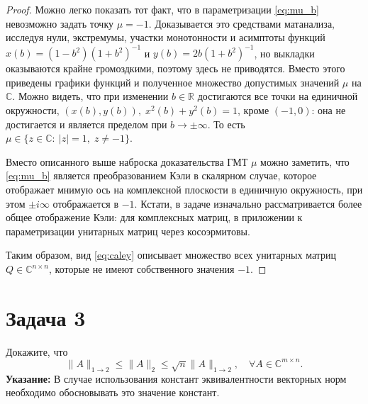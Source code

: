 \documentclass{article}
\newtheorem*{proof}{$\square$}
\newcommand{\R}{\mathbb{R}}
\renewcommand{\C}{\mathbb{C}}
\renewcommand{\leq}{\leqslant}
\begin{document}
\begin{proof}
		Можно легко показать тот факт, что в параметризации \eqref{eq:mu_b} невозможно задать точку $\mu=-1$. Доказывается это средствами матанализа, исследуя нули, экстремумы, участки монотонности и асимптоты функций $x(b)=(1-b^2)(1+b^2)^{-1}$ и $y(b)=2b (1+b^2)^{-1}$, но выкладки оказываются крайне громоздкими, поэтому здесь не приводятся. Вместо этого приведены графики функций и полученное множество допустимых значений $\mu$ на $\C$. Можно видеть, что при изменении $b\in\R$ достигаются все точки на единичной окружности, $(x(b), y(b)),\; x^2(b)+y^2(b)=1$, кроме $(-1, 0)$: она не достигается и является пределом при $b\rightarrow \pm \infty$. То есть $\mu \in \{z\in\C:\: |z|=1,\; z\neq -1\}$.
		
		Вместо описанного выше наброска доказательства ГМТ $\mu$ можно заметить, что \eqref{eq:mu_b} является преобразованием Кэли в скалярном случае, которое отображает мнимую ось на комплексной плоскости в единичную окружность, при этом $\pm i \infty$ отображается в $-1$. Кстати, в задаче изначально рассматривается более общее отображение Кэли: для комплексных матриц, в приложении к параметризации унитарных матриц через косоэрмитовы. 
		
		Таким образом, вид \eqref{eq:caley} описывает множество всех унитарных матриц $Q\in\C^{n\times n}$, которые не имеют собственного значения $-1$.
	\end{proof}
	
	\section*{Задача 3}
	Докажите, что
	\[
	\|A\|_{1\to 2} \leq  \|A\|_{2} \leq \sqrt{n} \|A\|_{1\to 2
	}, \quad \forall A\in\mathbb{C}^{m\times n}.
	\] 
	\textbf{Указание:} В случае использования констант эквивалентности векторных норм необходимо обосновывать это значение констант. 
	
\end{document}
